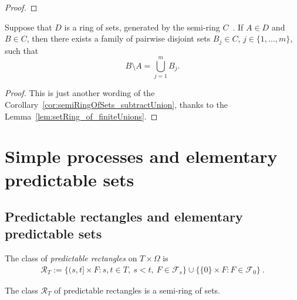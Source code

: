 \begin{proof}
  \leanok
\end{proof}

\begin{corollary}\label{cor:semiRingOfSets_subtract_ringElem}
  Suppose that $D$ is a ring of sets, generated by the semi-ring $C$~.
  If $A\in D$ and $B\in C$, then
  there exists a family of pairwise disjoint sets $B_j \in C$, $j \in \{1, ..., m\}$,
  such that
  \[
    B\setminus A = \bigcup_{j=1}^m B_j.
  \]
\end{corollary}

\begin{proof}
This is just another wording of the Corollary~\ref{cor:semiRingOfSets_subtractUnion},
thanks to the Lemma~\ref{lem:setRing_of_finiteUnions}.
\end{proof}


\section{Simple processes and elementary predictable sets}

\subsection{Predictable rectangles and elementary predictable sets}

\begin{definition}\label{def:predictableRectangles}
The class of \emph{predictable rectangles} on $T \times \Omega$ is
\begin{align*}
  \mathcal{R}_T :=
  \big\{(s, t] \times F : s, t \in T,\ s < t,\ F \in \mathcal{F}_s\big\}
  \cup \big\{\{0\} \times F : F \in \mathcal{F}_0\big\}
  \: .
\end{align*}
\end{definition}

\begin{lemma}\label{lem:predictableRectangles_isSetSemiring}
The class $\mathcal{R}_T$ of predictable rectangles
 is a semi-ring of sets.
\end{lemma}

